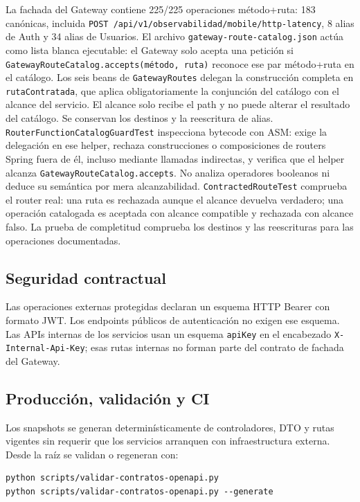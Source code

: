 La fachada del Gateway contiene 225/225 operaciones método+ruta: 183 canónicas,
incluida \texttt{POST /api/v1/observabilidad/mobile/http-latency}, 8 alias de
Auth y 34 alias de Usuarios. El archivo \texttt{gateway-route-catalog.json}
actúa como lista blanca ejecutable: el Gateway solo acepta una petición si
\texttt{GatewayRouteCatalog.accepts(método, ruta)} reconoce ese par
método+ruta en el catálogo. Los seis beans de
\texttt{GatewayRoutes} delegan la construcción completa en
\texttt{rutaContratada}, que aplica obligatoriamente la conjunción del catálogo
con el alcance del servicio. El alcance solo recibe el path y no puede alterar
el resultado del catálogo. Se conservan los destinos y la reescritura de alias.
\texttt{RouterFunctionCatalogGuardTest} inspecciona bytecode con ASM: exige
la delegación en ese helper, rechaza construcciones o composiciones de routers
Spring fuera de él, incluso mediante llamadas indirectas, y verifica que el
helper alcanza \texttt{GatewayRouteCatalog.accepts}. No analiza operadores
booleanos ni deduce su semántica por mera alcanzabilidad.
\texttt{ContractedRouteTest} comprueba el router real: una ruta
 es rechazada aunque el alcance devuelva
verdadero; una operación catalogada es aceptada con alcance compatible y
rechazada con alcance falso. La prueba de completitud comprueba los destinos
y las reescrituras para las operaciones documentadas.

\subsection{Seguridad contractual}

Las operaciones externas protegidas declaran un esquema HTTP Bearer con formato
JWT. Los endpoints públicos de autenticación no exigen ese esquema. Las APIs
internas de los servicios usan un esquema \texttt{apiKey} en el encabezado
\texttt{X-Internal-Api-Key}; esas rutas internas no forman parte del contrato de
fachada del Gateway.

\subsection{Producción, validación y CI}

Los snapshots se generan determinísticamente de controladores, DTO y rutas
vigentes sin requerir que los servicios arranquen con infraestructura externa.
Desde la raíz se validan o regeneran con:

\begin{lstlisting}
python scripts/validar-contratos-openapi.py
python scripts/validar-contratos-openapi.py --generate
\end{lstlisting}


